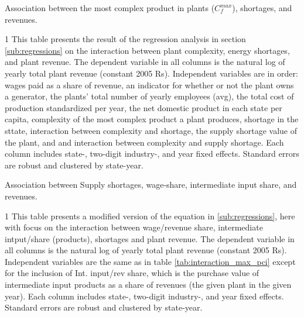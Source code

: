 \documentclass[11pt]{article}
\begin{document}
\begin{sidewaystable}
	\begin{center}
		\begin{threeparttable}
		\caption{Association between the most complex product in plants ($C^{max}_{f}$), shortages, and revenues.}
			\label{tab:interaction_max_pci}
			
			\begin{tablenotes} \footnotesize
			\item[1] This table presents the result of the regression analysis in section \ref{sub:regressions} on the interaction between plant complexity, energy shortages, and plant revenue. The dependent variable in all columns is the natural log of yearly total plant revenue (constant 2005 Rs). Independent variables are in order: wages paid as a share of revenue, an indicator for whether or not the plant owns a generator, the plants' total number of yearly employees (avg), the total cost of production standardized per year, the net domestic product in each state per capita, complexity of the most complex product a plant produces, shortage in the sttate, interaction between complexity and shortage, the supply shortage value of the plant, and and interaction between complexity and supply shortage. Each column includes state-, two-digit industry-, and year fixed effects. Standard errors are robust and clustered by state-year.
			\end{tablenotes}
		\end{threeparttable}
	\end{center}
\end{sidewaystable}


\begin{table}[H]
	\begin{center}
		\begin{threeparttable}
		\caption{Association between Supply shortages, wage-share, intermediate input share, and revenues.}
			\label{tab:interaction_wage_input}
			
			\begin{tablenotes} \footnotesize
			\item[1] This table presents a modified version of the equation in \ref{sub:regressions}, here with focus on the interaction between wage/revenue share, intermediate intput/share (products), shortages and plant revenue. The dependent variable in all columns is the natural log of yearly total plant revenue (constant 2005 Rs). Independent variables are the same as in table \ref{tab:interaction_max_pci} except for the inclusion of Int. input/rev share, which is the purchase value of intermediate input products as a share of revenues (the given plant in the given year). Each column includes state-, two-digit industry-, and year fixed effects. Standard errors are robust and clustered by state-year.
			\end{tablenotes}
		\end{threeparttable}
	\end{center}
\end{table}
\end{document}
